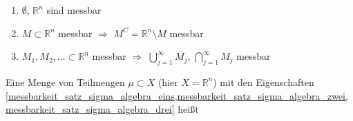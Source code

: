 \begin{proposition}
	\begin{enumerate}[label={(\alph*)}]
		\item {} $\emptyset$, $\mathbb{R}^n$ sind messbar
		\item {} $M\subset\mathbb{R}^n$ messbar $\Rightarrow$ $M^C = \mathbb{R}^n\setminus M$ messbar 
		\item {} $M_1, M_2, \dotsc\subset\mathbb{R}^n$ messbar $\Rightarrow$ $\bigcup_{j=1}^\infty M_j$, $\bigcap_{j=1}^\infty M_j$ messbar
	\end{enumerate}
\end{proposition}

\begin{*definition}
	Eine Menge von Teilmengen $\mu\subset X$  (hier $X=\mathbb{R}^n$) mit den Eigenschaften \cref{messbarkeit_satz_sigma_algebra_eins,messbarkeit_satz_sigma_algebra_zwei,messbarkeit_satz_sigma_algebra_drei} heißt 
\end{*definition}

